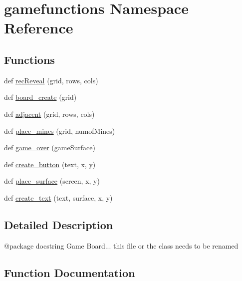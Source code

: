 \hypertarget{namespacegamefunctions}{}\section{gamefunctions Namespace Reference}
\label{namespacegamefunctions}
\subsection*{Functions}
\begin{DoxyCompactItemize}
\item 
def \hyperlink{namespacegamefunctions_a7d344c04c49594d58ba15b6673f9f8d9}{rec\+Reveal} (grid, rows, cols)
\item 
def \hyperlink{namespacegamefunctions_a26a89961ef41d92fb61c4703f9c63dca}{board\+\_\+create} (grid)
\item 
def \hyperlink{namespacegamefunctions_a0a55e81352e3e0790627bb267c2391ae}{adjacent} (grid, rows, cols)
\item 
def \hyperlink{namespacegamefunctions_acf46cabff90f0d1e06c4aadc3865292a}{place\+\_\+mines} (grid, numof\+Mines)
\item 
def \hyperlink{namespacegamefunctions_a08a81f3d3aebb362a637fa900ca9af5c}{game\+\_\+over} (game\+Surface)
\item 
def \hyperlink{namespacegamefunctions_a60920b30a54df9dfed7de61f17403e07}{create\+\_\+button} (text, x, y)
\item 
def \hyperlink{namespacegamefunctions_a109b9daf1366f60cec625c3ff29fd7dd}{place\+\_\+surface} (screen, x, y)
\item 
def \hyperlink{namespacegamefunctions_aad080841b3df3284089074d16588ed82}{create\+\_\+text} (text, surface, x, y)
\end{DoxyCompactItemize}


\subsection{Detailed Description}
\begin{DoxyVerb}@package docstring
   Game Board... this file or the class needs to be renamed
\end{DoxyVerb}
 

\subsection{Function Documentation}
\mbox{\label{namespacegamefunctions_a0a55e81352e3e0790627bb267c2391ae}} 

